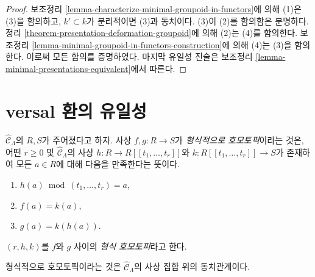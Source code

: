 \begin{proof}
보조정리 \ref{lemma-characterize-minimal-groupoid-in-functors}에 의해
(1)은 (3)을 함의하고, $k' \subset k$가 분리적이면 (3)과 동치이다.
(3)이 (2)를 함의함은 분명하다. 정리
\ref{theorem-presentation-deformation-groupoid}에 의해
(2)는 (4)를 함의한다. 보조정리
\ref{lemma-minimal-groupoid-in-functors-construction}에 의해
(4)는 (3)을 함의한다. 이로써 모든 함의를 증명하였다.
마지막 유일성 진술은 보조정리
\ref{lemma-minimal-presentations-equivalent}에서 따른다.
\end{proof}
\section{versal 환의 유일성}
\label{section-uniqueness}

\noindent
$\widehat{\mathcal{C}}_\Lambda$의 $R, S$가 주어졌다고 하자. 사상
$f, g : R \to S$가 {\it 형식적으로 호모토픽}이라는 것은, 어떤
$r \geq 0$ 및 $\widehat{\mathcal{C}}_\Lambda$의 사상
$h : R \to R[[t_1, \ldots, t_r]]$와
$k : R[[t_1, \ldots, t_r]] \to S$가 존재하여 모든 $a \in R$에 대해
다음을 만족한다는 뜻이다.
\begin{enumerate}
\item $h(a) \bmod (t_1, \ldots, t_r) = a$,
\item $f(a) = k(a)$,
\item $g(a) = k(h(a))$.
\end{enumerate}
$(r, h, k)$를 $f$와 $g$ 사이의 {\it 형식 호모토피}라고 한다.

\begin{lemma}
\label{lemma-homotopy}
형식적으로 호모토픽이라는 것은 $\widehat{\mathcal{C}}_\Lambda$의
사상 집합 위의 동치관계이다.
\end{lemma}


